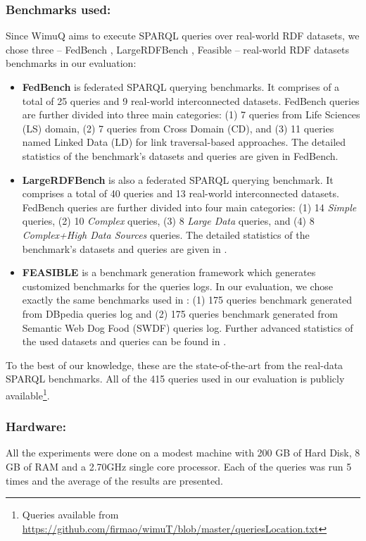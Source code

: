 \documentclass[sw]{iosart2x}
\begin{document}
\subsubsection{Benchmarks used:} Since WimuQ aims to execute SPARQL queries over real-world RDF datasets, we chose three -- FedBench \cite{fedbench2011}, LargeRDFBench \cite{largerdfbench2017}, Feasible \cite{feasible2015} -- real-world RDF datasets benchmarks in our evaluation: 
\begin{itemize}
  
\item \textbf{FedBench} is federated SPARQL querying benchmarks. It comprises of a total of 25 queries and 9 real-world interconnected datasets. FedBench queries are further divided into three main categories: (1) 7 queries from Life Sciences (LS) domain, (2) 7 queries from Cross Domain (CD), and (3) 11 queries named Linked Data (LD) for link traversal-based approaches. The detailed statistics of the benchmark's datasets and queries are given in FedBench\cite{fedbench2011}.

\item  \textbf{LargeRDFBench} is also a federated SPARQL querying benchmark. It comprises a total of 40 queries and 13 real-world interconnected datasets. FedBench queries are further divided into four main categories: (1) 14 \emph{Simple} queries, (2) 10 \emph{Complex} queries, (3)  8 \emph{Large Data} queries, and (4) 8 \emph{Complex+High Data Sources} queries. The detailed statistics of the benchmark's datasets and queries are given in \cite{largerdfbench2017}. 

\item  \textbf{FEASIBLE} is a benchmark generation framework which generates customized benchmarks for the queries logs. In our evaluation, we chose exactly the same benchmarks used in \cite{feasible2015}: (1) 175 queries benchmark generated from DBpedia queries log and (2) 175 queries benchmark generated from Semantic Web Dog Food (SWDF) queries log. Further advanced statistics of the used datasets and queries can be found in \cite{feasible2015}. 
\end{itemize}
To the best of our knowledge, these are the state-of-the-art from the real-data SPARQL benchmarks. All of the 415 queries used in our evaluation is publicly available\footnote{Queries available from \url{https://github.com/firmao/wimuT/blob/master/queriesLocation.txt}}. 

\subsubsection{Hardware:} All the experiments were done on a modest machine with 200 GB of Hard Disk, 8 GB of RAM and a 2.70GHz single core processor. Each of the queries was run 5 times and the average of the results are presented.  
\end{document}
